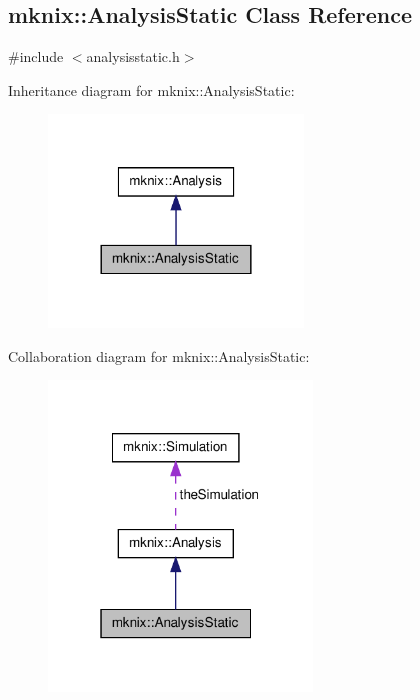 \hypertarget{classmknix_1_1_analysis_static}{\subsection{mknix\-:\-:Analysis\-Static Class Reference}
\label{classmknix_1_1_analysis_static}
}


{\ttfamily \#include $<$analysisstatic.\-h$>$}



Inheritance diagram for mknix\-:\-:Analysis\-Static\-:\nopagebreak
\begin{figure}[H]
\begin{center}
\leavevmode
\includegraphics[width=192pt]{dd/dc4/classmknix_1_1_analysis_static__inherit__graph}
\end{center}
\end{figure}


Collaboration diagram for mknix\-:\-:Analysis\-Static\-:\nopagebreak
\begin{figure}[H]
\begin{center}
\leavevmode
\includegraphics[width=199pt]{d2/dab/classmknix_1_1_analysis_static__coll__graph}
\end{center}
\end{figure}

